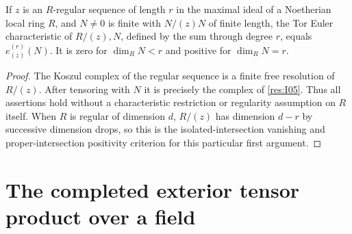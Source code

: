 \begin{corollary}\label{res:I06}
If \(z\) is an \(R\)-regular sequence of length \(r\) in the maximal
ideal of a Noetherian local ring \(R\), and \(N\ne 0\) is finite
with \(N/(z)N\) of finite length, the Tor Euler characteristic
of \(R/(z),N\), defined by the sum through degree \(r\), equals
\(e^{(r)}_{(z)}(N)\).
It is zero for \(\dim_R N<r\) and positive for \(\dim_R N=r\).
\end{corollary}
\begin{proof}
The Koszul complex of the regular sequence is a finite free
resolution of \(R/(z)\). \cite[Chapter 5]{core}
After tensoring with \(N\) it is precisely the complex of
\ref{res:I05}. Thus all assertions hold without a characteristic
restriction or regularity assumption on \(R\) itself. When \(R\)
is regular of dimension \(d\), \(R/(z)\) has dimension \(d-r\) by
successive dimension drops, so this is the isolated-intersection
vanishing and proper-intersection positivity criterion for this
particular first argument.
\end{proof}

\section{The completed exterior tensor product over a field}

